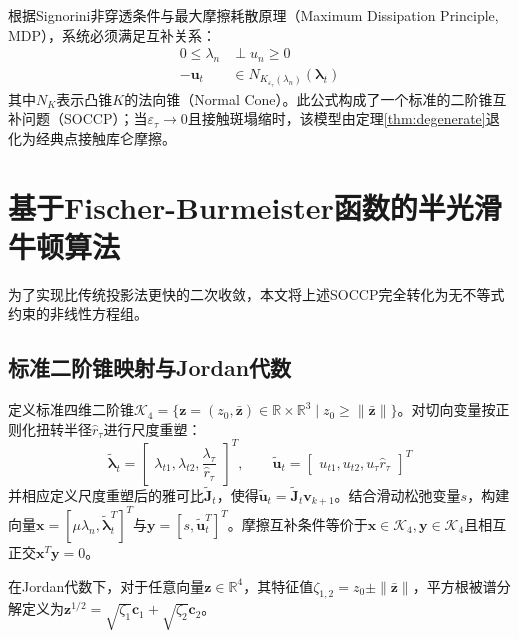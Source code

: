 ﻿\documentclass[12pt, a4paper]{ctexart}
\theoremstyle{plain}
\theoremstyle{remark}
\begin{document}
根据Signorini非穿透条件与最大摩擦耗散原理（Maximum Dissipation Principle, MDP），系统必须满足互补关系：
\begin{align}
    0 \le \lambda_n &\perp u_n \ge 0 \\
    -\bm{u}_t &\in N_{K_{\varepsilon_{\tau}}(\lambda_n)}(\bm{\lambda}_t)
\end{align}
其中$N_K$表示凸锥$K$的法向锥（Normal Cone）。此公式构成了一个标准的二阶锥互补问题（SOCCP）；当$\varepsilon_{\tau} \to 0$且接触斑塌缩时，该模型由定理\ref{thm:degenerate}退化为经典点接触库仑摩擦。

\section{基于Fischer-Burmeister函数的半光滑牛顿算法}
为了实现比传统投影法更快的二次收敛，本文将上述SOCCP完全转化为无不等式约束的非线性方程组。

\subsection{标准二阶锥映射与Jordan代数}
定义标准四维二阶锥$\mathcal{K}_4 = \{ \bm{z} = (z_0, \bar{\bm{z}}) \in \mathbb{R} \times \mathbb{R}^3 \mid z_0 \ge \|\bar{\bm{z}}\| \}$。对切向变量按正则化扭转半径$\hat{r}_\tau$进行尺度重塑：
\begin{equation}
    \tilde{\bm{\lambda}}_t =
    \begin{bmatrix}
        \lambda_{t1}, \lambda_{t2}, \dfrac{\lambda_{\tau}}{\hat{r}_\tau}
    \end{bmatrix}^T,
    \qquad
    \tilde{\bm{u}}_t =
    \begin{bmatrix}
        u_{t1}, u_{t2}, u_{\tau} \hat{r}_\tau
    \end{bmatrix}^T
\end{equation}
并相应定义尺度重塑后的雅可比$\tilde{\bm{J}}_t$，使得$\tilde{\bm{u}}_t = \tilde{\bm{J}}_t \bm{v}_{k+1}$。结合滑动松弛变量$s$，构建向量$\bm{x} = [\mu \lambda_n, \tilde{\bm{\lambda}}_t^T]^T$与$\bm{y} = [s, \tilde{\bm{u}}_t^T]^T$。摩擦互补条件等价于$\bm{x} \in \mathcal{K}_4, \bm{y} \in \mathcal{K}_4$且相互正交$\bm{x}^T \bm{y} = 0$。

在Jordan代数下，对于任意向量$\bm{z} \in \mathbb{R}^4$，其特征值$\zeta_{1,2} = z_0 \pm \|\bar{\bm{z}}\|$，平方根被谱分解定义为$\bm{z}^{1/2} = \sqrt{\zeta_1} \bm{c}_1 + \sqrt{\zeta_2} \bm{c}_2$。
\end{document}
